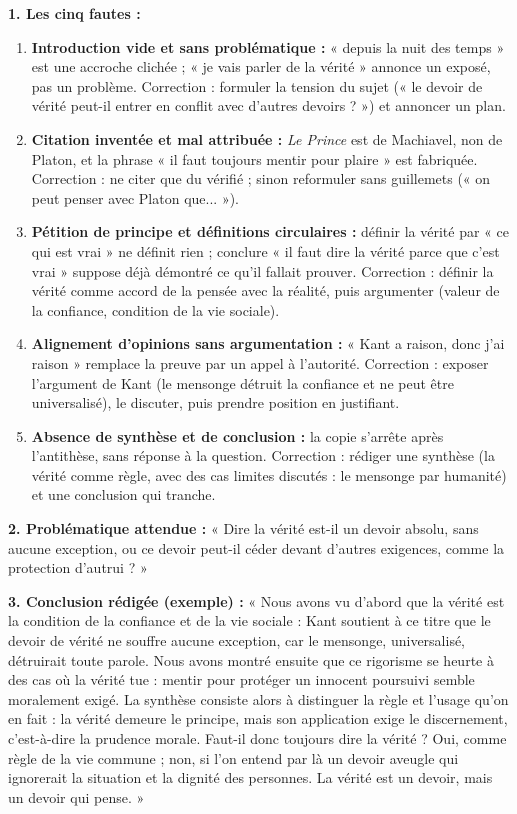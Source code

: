 \documentclass[11pt]{article}
\begin{document}
\begin{corrige}
\textbf{1. Les cinq fautes :}
\begin{enumerate}
\item \textbf{Introduction vide et sans problématique :} « depuis la nuit des temps » est une accroche clichée ; « je vais parler de la vérité » annonce un exposé, pas un problème. Correction : formuler la tension du sujet (« le devoir de vérité peut-il entrer en conflit avec d'autres devoirs ? ») et annoncer un plan.
\item \textbf{Citation inventée et mal attribuée :} \emph{Le Prince} est de Machiavel, non de Platon, et la phrase « il faut toujours mentir pour plaire » est fabriquée. Correction : ne citer que du vérifié ; sinon reformuler sans guillemets (« on peut penser avec Platon que... »).
\item \textbf{Pétition de principe et définitions circulaires :} définir la vérité par « ce qui est vrai » ne définit rien ; conclure « il faut dire la vérité parce que c'est vrai » suppose déjà démontré ce qu'il fallait prouver. Correction : définir la vérité comme accord de la pensée avec la réalité, puis argumenter (valeur de la confiance, condition de la vie sociale).
\item \textbf{Alignement d'opinions sans argumentation :} « Kant a raison, donc j'ai raison » remplace la preuve par un appel à l'autorité. Correction : exposer l'argument de Kant (le mensonge détruit la confiance et ne peut être universalisé), le discuter, puis prendre position en justifiant.
\item \textbf{Absence de synthèse et de conclusion :} la copie s'arrête après l'antithèse, sans réponse à la question. Correction : rédiger une synthèse (la vérité comme règle, avec des cas limites discutés : le mensonge par humanité) et une conclusion qui tranche.
\end{enumerate}

\textbf{2. Problématique attendue :} « Dire la vérité est-il un devoir absolu, sans aucune exception, ou ce devoir peut-il céder devant d'autres exigences, comme la protection d'autrui ? »

\textbf{3. Conclusion rédigée (exemple) :} « Nous avons vu d'abord que la vérité est la condition de la confiance et de la vie sociale : Kant soutient à ce titre que le devoir de vérité ne souffre aucune exception, car le mensonge, universalisé, détruirait toute parole. Nous avons montré ensuite que ce rigorisme se heurte à des cas où la vérité tue : mentir pour protéger un innocent poursuivi semble moralement exigé. La synthèse consiste alors à distinguer la règle et l'usage qu'on en fait : la vérité demeure le principe, mais son application exige le discernement, c'est-à-dire la prudence morale. Faut-il donc toujours dire la vérité ? Oui, comme règle de la vie commune ; non, si l'on entend par là un devoir aveugle qui ignorerait la situation et la dignité des personnes. La vérité est un devoir, mais un devoir qui pense. »


\end{corrige}
\end{document}

